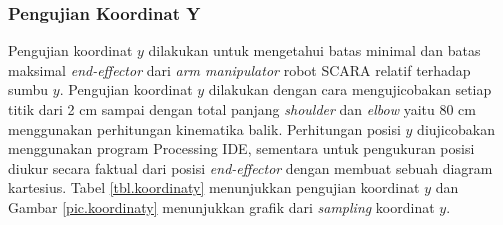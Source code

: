 \subsubsection{Pengujian Koordinat Y}
Pengujian koordinat $y$ dilakukan untuk mengetahui batas minimal dan batas maksimal \textit{end-effector} dari \textit{arm manipulator} robot SCARA relatif terhadap sumbu $y$. Pengujian koordinat $y$ dilakukan dengan cara mengujicobakan setiap titik dari 2 cm sampai dengan total panjang \textit{shoulder} dan \textit{elbow} yaitu 80 cm menggunakan perhitungan kinematika balik. Perhitungan posisi $y$ diujicobakan menggunakan program Processing IDE, sementara untuk pengukuran posisi diukur secara faktual dari posisi \textit{end-effector} dengan membuat sebuah diagram kartesius. Tabel \ref{tbl.koordinaty} menunjukkan pengujian koordinat $y$ dan Gambar \ref{pic.koordinaty} menunjukkan grafik dari \textit{sampling} koordinat $y$.
